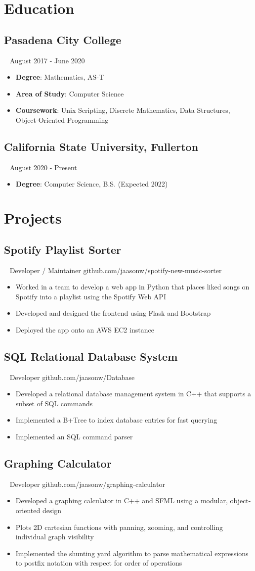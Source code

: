 \documentclass{article}
\newcommand{\resumesection}[3]{
    \subsection*{#1}
    \ 
    \footnotesize
    \textcolor{csufgrey}{#2}
    \footnotesize
    \hfill
    \textcolor{csufgrey}{#3}
    \normalsize
}
\begin{document}
\pagestyle{useheader}

\section*{Education}
\resumesection{Pasadena City College}{}{August 2017 - June 2020}
\begin{itemize}
    \item \textbf{Degree}: Mathematics, AS-T
    \item \textbf{Area of Study}: Computer Science
    \item \textbf{Coursework}: Unix Scripting, Discrete Mathematics, Data Structures, Object-Oriented Programming
\end{itemize}

\resumesection{California State University, Fullerton}{}{August 2020 - Present}
\begin{itemize}
    \item \textbf{Degree}: Computer Science, B.S. (Expected 2022)
\end{itemize}
\hfill
\section*{Projects}
\resumesection{Spotify Playlist Sorter}{Developer / Maintainer}{github.com/jaasonw/spotify-new-music-sorter}
\begin{itemize}
    \item Worked in a team to develop a web app in Python that places liked songs on Spotify into a playlist using the Spotify Web API
    \item Developed and designed the frontend using Flask and Bootstrap
    \item Deployed the app onto an AWS EC2 instance
\end{itemize}

\resumesection{SQL Relational Database System}{Developer}{github.com/jaasonw/Database}
\begin{itemize}
    \item Developed a relational database management system in C++ that supports a subset of SQL commands
    \item Implemented a B+Tree to index database entries for fast querying
    \item Implemented an SQL command parser
\end{itemize}

\resumesection{Graphing Calculator}{Developer}{github.com/jaasonw/graphing-calculator}
\begin{itemize}
    \item Developed a graphing calculator in C++ and SFML using a modular, object-oriented design
    \item Plots 2D cartesian functions with panning, zooming, and controlling individual graph visibility
    \item Implemented the shunting yard algorithm to parse mathematical expressions to postfix notation with respect for order of operations
\end{itemize}
\end{document}

